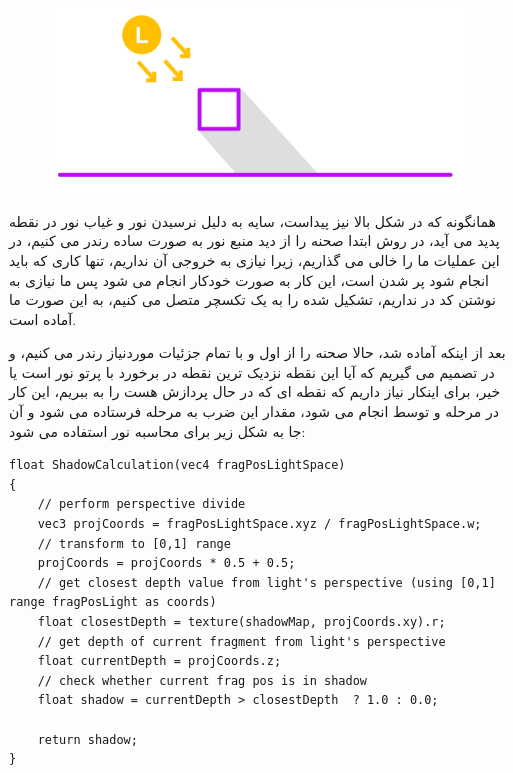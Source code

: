 \documentclass[a4paper, 12pt]{book}
\newcommand{\lrit}[1]{\lr{\textit{#1}}}
\begin{document}
\begin{figure}[H]
    \centering
    \href{https://github.com/devprofile98/shm}{
        \includegraphics[width=11cm]{images/shadow.png}
    }
    \caption{}
    \label{fig:my_label}
\end{figure}

    همانگونه که در شکل بالا نیز پیداست، سایه به دلیل نرسیدن نور و غیاب نور در نقطه پدید می آید، در روش  ابتدا صحنه را از دید منبع نور به صورت ساده رندر می کنیم، در این عملیات ما  را خالی می گذاریم، زیرا نیازی به خروجی آن نداریم، تنها کاری که باید انجام شود پر شدن  است، این کار به صورت خودکار انجام می شود پس ما نیازی به نوشتن کد در  نداریم،  تشکیل شده را به یک تکسچر متصل می کنیم، به این صورت  ما آماده است.\par
    بعد از اینکه  آماده شد، حالا صحنه را از اول و با تمام جزئیات موردنیاز رندر می کنیم، و در  تصمیم می گیریم که آیا این نقطه نزدیک ترین نقطه در برخورد با پرتو نور است یا خیر، برای اینکار نیاز داریم که نقطه ای که در حال پردازش هست را به  ببریم، این کار در مرحله  و توسط  انجام می شود، مقدار این ضرب به مرحله  فرستاده می شود و آن جا به شکل زیر برای محاسبه نور استفاده می شود:

    \begin{LTR}
    \small
        \begin{lstlisting}[style=C++Style,caption=\lrit{calculate shadow}]
float ShadowCalculation(vec4 fragPosLightSpace)
{
    // perform perspective divide
    vec3 projCoords = fragPosLightSpace.xyz / fragPosLightSpace.w;
    // transform to [0,1] range
    projCoords = projCoords * 0.5 + 0.5;
    // get closest depth value from light's perspective (using [0,1] range fragPosLight as coords)
    float closestDepth = texture(shadowMap, projCoords.xy).r;
    // get depth of current fragment from light's perspective
    float currentDepth = projCoords.z;
    // check whether current frag pos is in shadow
    float shadow = currentDepth > closestDepth  ? 1.0 : 0.0;

    return shadow;
}
        \end{lstlisting}
    \end{LTR}
    \normalsize
    \vspace*{0.3cm}
\end{document}
